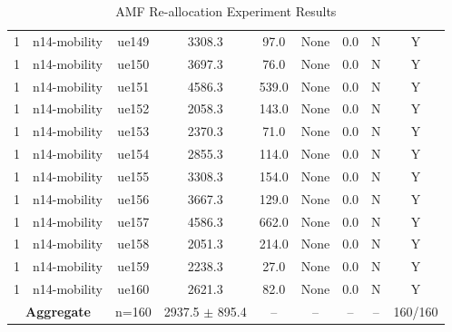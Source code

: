\begin{table}[ht]
\begin{tabular}{|c|c|c|c|c|c|c|c|c|}
1 & n14-mobility & ue149 & 3308.3 & 97.0 & None & 0.0 & N & Y \\
1 & n14-mobility & ue150 & 3697.3 & 76.0 & None & 0.0 & N & Y \\
1 & n14-mobility & ue151 & 4586.3 & 539.0 & None & 0.0 & N & Y \\
1 & n14-mobility & ue152 & 2058.3 & 143.0 & None & 0.0 & N & Y \\
1 & n14-mobility & ue153 & 2370.3 & 71.0 & None & 0.0 & N & Y \\
1 & n14-mobility & ue154 & 2855.3 & 114.0 & None & 0.0 & N & Y \\
1 & n14-mobility & ue155 & 3308.3 & 154.0 & None & 0.0 & N & Y \\
1 & n14-mobility & ue156 & 3667.3 & 129.0 & None & 0.0 & N & Y \\
1 & n14-mobility & ue157 & 4586.3 & 662.0 & None & 0.0 & N & Y \\
1 & n14-mobility & ue158 & 2051.3 & 214.0 & None & 0.0 & N & Y \\
1 & n14-mobility & ue159 & 2238.3 & 27.0 & None & 0.0 & N & Y \\
1 & n14-mobility & ue160 & 2621.3 & 82.0 & None & 0.0 & N & Y \\
\multicolumn{2}{|c|}{\textbf{Aggregate}} & n=160 & 2937.5 $\pm$ 895.4 & -- & -- & -- & -- & 160/160 \\
\hline
\end{tabular}
\caption{AMF Re-allocation Experiment Results}
\label{tab:amf_realloc}
\end{table}
